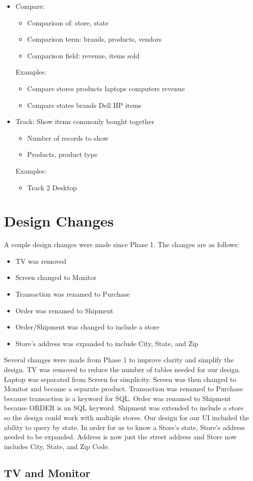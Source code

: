\documentclass{article}
\begin{document}
\begin{itemize}
      \item
        Compare:
        \begin{itemize}
          \item Comparison of: store, state
          \item Comparison term: brands, products, vendors
          \item Comparison field: revenue, items sold
        \end{itemize}
        Examples:
        \begin{itemize}
          \item Compare stores products laptops computers revenue 
          \item Compare states brands Dell HP items
        \end{itemize}

      \item
        Track: Show items commonly bought together
        \begin{itemize}
          \item Number of records to show
          \item Products, product type
        \end{itemize}
        Examples:
        \begin{itemize}
          \item Track 2 Desktop
        \end{itemize}
    \end{itemize}

  \section{Design Changes}
    A couple design changes were made since Phase 1. The changes are as follows:
    \begin{itemize}
      \item TV was removed
      \item Screen changed to Monitor
      \item Transaction was renamed to Purchase
      \item Order was renamed to Shipment
      \item Order/Shipment was changed to include a store
      \item Store's address was expanded to include City, State, and Zip
    \end{itemize}
    Several changes were made from Phase 1 to improve clarity and simplify the design.  TV was
    removed to reduce the number of tables needed for our design.  Laptop was separated from
    Screen for simplicity. Screen was then changed to Monitor and became a separate product.
    Transaction was renamed to Purchase because transaction is a keyword for SQL.  Order was
    renamed to Shipment because ORDER is an SQL keyword. Shipment was extended to include a
    store so the design could work with multiple stores.  Our design for our UI included the
    ability to query by state. In order for us to know a Store's state, Store's address needed
    to be expanded. Address is now just the street address and Store now includes City, State,
    and Zip Code.
    \subsection{TV and Monitor}


  
\end{document}
